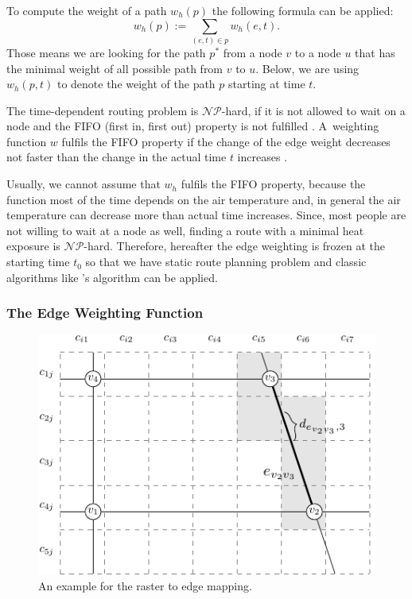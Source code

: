 To compute the weight of a path $w_h(p)$ the following formula can be applied:
	\begin{equation}\label{eq:path-weight}
		w_h(p) := \sum_{(e,t) \in p} w_h(e, t).
	\end{equation}
Those means we are looking for the path $p^*$ from a node $v$ to a node $u$ that has the minimal weight of all possible path from $v$ to $u$. Below, we are using $w_h(p, t)$ to denote the weight of the path $p$ starting at time $t$. 

The time-dependent routing problem is $\mathcal{NP}$-hard, if it is not allowed to wait on a node and the FIFO (first in, first out) property is not fulfilled \parencite{Orda1990}. A~weighting function $w$ fulfils the FIFO property if the change of the edge weight decreases not faster than the change in the actual time $t$ increases \parencite{Kaufman1993}. 

Usually, we cannot assume that $w_h$ fulfils the FIFO property, because the function most of the time depends on the air temperature and, in general the air temperature can decrease more than actual time increases. Since, most people are not willing to wait at a node as well, finding a route with a minimal heat exposure is $\mathcal{NP}$-hard.
Therefore, hereafter the edge weighting is frozen at the starting time $t_0$ so that we have static route planning problem and classic algorithms like  \citeauthor{Dijkstra1959}'s algorithm \parencite{Dijkstra1959} can be applied. 

\subsubsection{The Edge Weighting Function \label{sec:edge-weighting}}

\begin{figure}
	\centering
	\includegraphics{figures/raster-edge-mapping-standalone}
	\caption[Example for the raster to edge mapping]{An 
		example for the raster to edge mapping.}
	\label{fig:raster-edge-mapping}
\end{figure}

